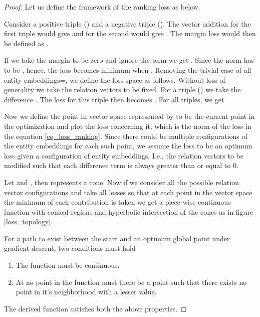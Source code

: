 \documentclass[sigconf]{acmart}
\begin{document}
\begin{proof}
\par \noindent Let us define the framework of the ranking loss as below.
\par \noindent Consider a positive triple () and a negative triple (). The vector addition for the first triple would give  and for the second would give . The margin loss would then be defined as .
\par \noindent If we take the margin to be zero and ignore the term  we get . Since the norm has to be , hence, the loss becomes minimum when . Removing the trivial case of all entity embeddings=, we define the loss space as follows. Without loss of generality we take the relation vectors to be fixed. For a triple () we take the difference . The loss for this triple then becomes . For all triples, we get 



\par \noindent Now we define the point in vector space represented by  to be the current point in the optimization and plot the loss concerning it, which is the norm of the loss in the equation \ref{eq_loss_ranking}. Since there could be multiple configurations of the entity embeddings for each such point, we assume the loss to be an optimum loss given a configuration of entity embeddings. I.e., the relation vectors to be modified such that each difference term  is always greater than or equal to 0.
\par \noindent Let   and  , then  represents a cone. Now if we consider all the possible relation vector configurations and take all losses so that at each point in the vector space the minimum of each contribution is taken we get a piece-wise continuous function with conical regions and hyperbolic intersection of the cones as in figure \ref{loss_topology}.
\par \noindent For a path to exist between the start and an optimum global point under gradient descent, two conditions must hold\:
\begin{enumerate}
    \item The function must be continuous.
    \item At no point in the function must there be a point such that there exists no point in it’s neighborhood with a lesser value.
\end{enumerate}
The derived function satisfies both the above properties.
\end{proof}
\end{document}
